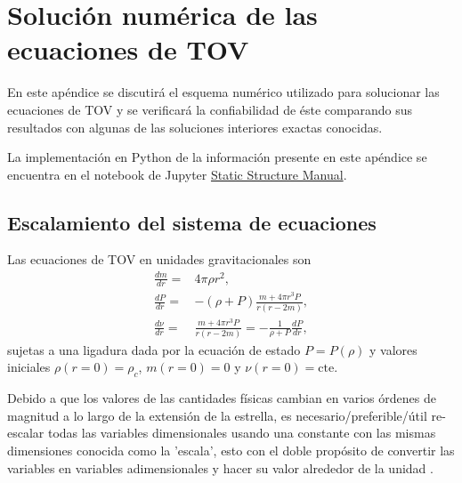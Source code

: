\chapter{Solución numérica de las ecuaciones de TOV}\label{NumSol}
En este apéndice se discutirá el esquema numérico utilizado para solucionar las ecuaciones de TOV y se verificará la confiabilidad de éste comparando sus resultados con algunas de las soluciones interiores exactas conocidas.

La implementación en Python de la información presente en este apéndice se encuentra en el notebook de Jupyter \href{https://nbviewer.jupyter.org/github/DavidRamosSal/stellar_structure/blob/master/Static_structure_manual.ipynb}{Static Structure Manual}.

\section{Escalamiento del sistema de ecuaciones}
Las ecuaciones de TOV en unidades gravitacionales son
\begin{align}
    \frac{dm}{dr}=&4\pi \rho r^2 ,\\
    \frac{dP}{dr}=&-(\rho+P)\frac{m+4\pi r^3 P}{r(r-2m)} , \\
    \frac{d\nu}{dr}=& \frac{m+4\pi r^3 P}{r(r-2m)} =  -\frac{1}{\rho+P}\frac{dP}{dr},
\end{align}
sujetas a una ligadura dada por la ecuación de estado $P=P(\rho)$ y valores iniciales $\rho(r=0)=\rho_c$, $m(r=0)=0$ y $\nu(r=0)=\text{cte}$.

Debido a que los valores de las cantidades físicas cambian en varios órdenes de magnitud a lo largo de la extensión de la estrella, es necesario/preferible/útil re-escalar todas las variables dimensionales usando una constante con las mismas dimensiones conocida como la 'escala', esto con el doble propósito de convertir las variables en variables adimensionales y hacer su valor alrededor de la unidad \cite{Langtangen2016ScalingEquations}.

